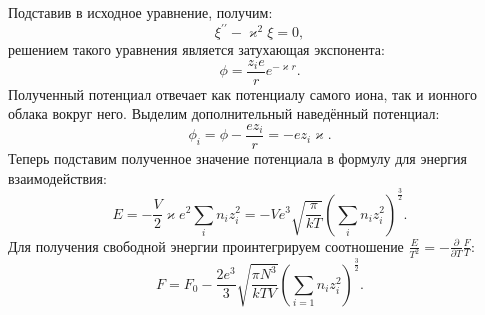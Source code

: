\documentclass[12pt]{article}
\begin{document}
Подставив в исходное уравнение, получим: 
\[
    \xi^{\prime\prime} - \varkappa^2 \xi = 0,
\]
решением такого уравнения является затухающая экспонента: 
\[
    \phi = \frac{z_i e}{r} e^{-\varkappa r}.
\]
Полученный потенциал отвечает как потенциалу самого иона, так и ионного облака вокруг него.
Выделим дополнительный наведённый потенциал: 
\[
    \phi_i = \phi - \frac{e z_i}{r} = - e z_i \varkappa.
\]
Теперь подставим полученное значение потенциала в формулу для энергия взаимодействия: 
\[
    E = -\frac{V}{2} \varkappa e^2 \sum_{i} n_i z_i^2 = 
    -V e^3 \sqrt{\frac{\pi}{kT}} \left( \sum_{i} n_i z_i^2 \right)^\frac{3}{2}. 
\]
Для получения свободной энергии проинтегрируем соотношение 
$\frac{E}{T^2} = - \frac{\partial}{\partial T} \frac{F}{T}$: 
\[
    F = F_0 - \frac{2e^3}{3} \sqrt{\frac{\pi N^3}{kTV}}\left( \sum_{i=1} n_i z_i^2 \right)^\frac{3}{2}.
\] 
\end{document}
